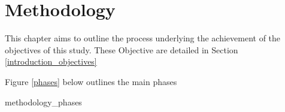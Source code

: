 \chapter{Methodology}

This chapter aims to outline the process underlying the achievement of the
objectives of this study. These Objective are detailed in
Section \ref{introduction_objectives}

Figure \ref{phases} below outlines the main phases   

{methodology_phases}












